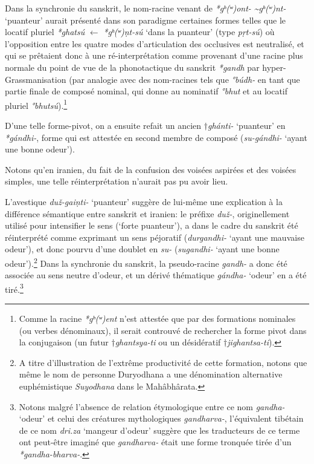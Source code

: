 \documentclass[11pt]{article}
\newcommand{\ipa}[1]{{\phon\textit{#1}}}
\begin{document}
Dans la synchronie du sanskrit, le nom-racine venant de \ipa{*gʰ(ʷ)ont- \textasciitilde *gʰ(ʷ)nt-} `puanteur' aurait présenté dans son paradigme certaines formes telles que le locatif pluriel \ipa{*ghatsú} $\leftarrow$ \ipa{*gʰ(ʷ)ṇt-sú} `dans la puanteur' (type \ipa{pṛt-sú}) où l'opposition entre les quatre modes d'articulation des occlusives est neutralisé, et qui se prêtaient donc à une ré-interprétation comme provenant d'une racine plus normale du point de vue de la phonotactique du sanskrit \ipa{*gandh} par hyper-Grassmanisation (par analogie avec des nom-racines tels que \ipa{°búdh-} en tant que partie finale de composé nominal, qui donne au nominatif \ipa{°bhut} et au locatif pluriel \ipa{°bhutsú}).\footnote{Comme la racine \ipa{*gʰ(ʷ)ent} n'est attestée que par des formations nominales (ou verbes dénominaux), il serait controuvé de rechercher la forme pivot dans la conjugaison (un futur $\dagger$\ipa{ghantsya-ti} ou un désidératif $\dagger$\ipa{jighantsa-ti}). }

D'une telle forme-pivot, on a ensuite refait un ancien $\dagger$\ipa{ghánti-} `puanteur' en \ipa{*gándhi-}, forme qui est attestée en second membre de composé (\ipa{su-gándhi-} `ayant une bonne odeur').

Notons qu'en iranien, du fait de la confusion des voisées aspirées et des voisées simples, une telle réinterprétation n'aurait pas pu avoir lieu.

L'avestique \ipa{duž-gaiṇti-} `puanteur' suggère de lui-même une explication à la différence sémantique entre sanskrit et iranien: le préfixe \ipa{duž-}, originellement utilisé pour intensifier le sens (`forte puanteur'), a dans le cadre du sanskrit été réinterprété comme exprimant un sens péjoratif (\ipa{durgandhi-} `ayant une mauvaise odeur'), et donc pourvu d'une doublet en \ipa{su-} (\ipa{sugandhi-} `ayant une bonne odeur').\footnote{A titre d'illustration de l'extrême productivité de cette formation, notons que même le nom de personne Duryodhana a  une dénomination alternative euphémistique \textit{Suyodhana} dans le Mahâbhârata.} Dans la synchronie du sanskrit, la pseudo-racine \ipa{gandh-} a donc été associée au sens neutre d'odeur, et un dérivé thématique \ipa{gándha-} `odeur' en a été tiré.\footnote{Notons malgré l'absence de relation étymologique entre ce nom \ipa{gandha-} `odeur' et celui des créatures mythologiques \ipa{gandharva-}, l'équivalent tibétain de ce nom \ipa{dri.za} `mangeur d'odeur' suggère que les traducteurs de ce terme ont peut-être imaginé que \ipa{gandharva-} était une forme tronquée tirée d'un \ipa{*gandha-bharva-}.}
\end{document}
